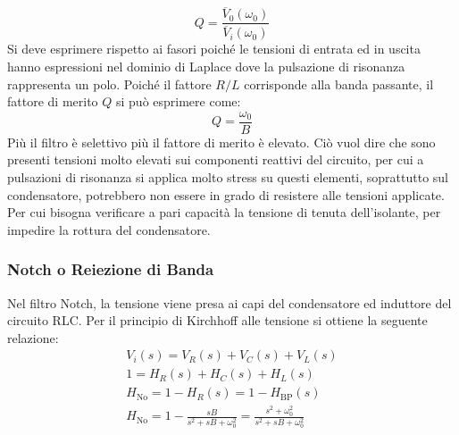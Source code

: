 \documentclass{article}
\numberwithin{equation}{subsection}
\begin{document}
\begin{equation}
    Q=\displaystyle\frac{\overline V_0(\omega_0)}{\overline V_{i}(\omega_0)}
\end{equation}
Si deve esprimere rispetto ai fasori poiché le tensioni di entrata ed in uscita hanno espressioni nel dominio di Laplace dove la pulsazione di risonanza rappresenta un polo. 
Poiché il fattore $R/L$ corrisponde alla banda passante, il fattore di merito $Q$ si può esprimere come:
\begin{equation}
    Q=\displaystyle\frac{\omega_0}{B}
\end{equation}
Più il filtro è selettivo più il fattore di merito è elevato. Ciò vuol dire che sono presenti tensioni molto elevati sui componenti reattivi del circuito, per cui 
a pulsazioni di risonanza si applica molto stress su questi elementi, soprattutto sul condensatore, potrebbero non essere in grado di resistere alle tensioni applicate. 
Per cui bisogna verificare a pari capacità la tensione di tenuta dell'isolante, per impedire la rottura del condensatore. 

\subsubsection{Notch o Reiezione di Banda}

Nel filtro Notch, la tensione viene presa ai capi del condensatore ed induttore del circuito RLC. 
Per il principio di Kirchhoff alle tensione si ottiene la seguente relazione:
\begin{gather*}
    V_i(s)=V_R(s)+V_C(s)+V_L(s)\\
    1=H_R(s)+H_C(s)+H_L(s)\\
    H_{\mathrm{\mathrm{No}}}=1-H_R(s)=1-H_{\mathrm{BP}}(s)\\
    H_{\mathrm{\mathrm{No}}}=1-\displaystyle\frac{sB}{s^2+sB+\omega_0^2}=\frac{s^2+\omega_0^2}{s^2+sB+\omega_0^2}
\end{gather*}
\end{document}
